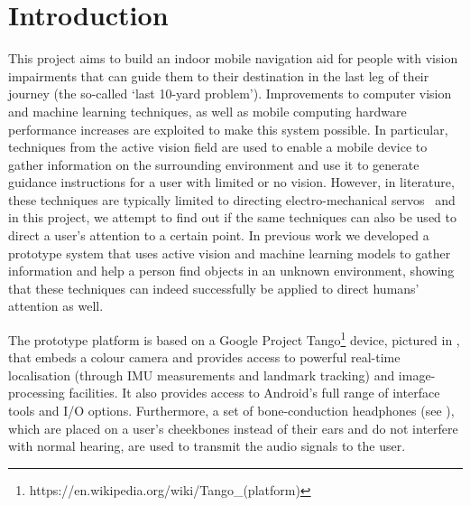 \documentclass[acmsmall]{acmart}
\begin{document}


\maketitle

\section{Introduction}

This project aims to build an indoor mobile navigation aid for people with vision impairments that can guide them to their destination in the last leg of their journey (the so-called `last 10-yard problem').
Improvements to computer vision and machine learning techniques, as well as mobile computing hardware performance increases are exploited to make this system possible.
In particular, techniques from the active vision field are used to enable a mobile device to gather information on the surrounding environment and use it to generate guidance instructions for a user with limited or no vision.
However, in literature, these techniques are typically limited to directing electro-mechanical servos~\citep{bajcsy2018revisiting} and in this project, we attempt to find out if the same techniques can also be used to direct a user's attention to a certain point. 
In previous work we developed a prototype system that uses active vision and machine learning models to gather information and help a person find objects in an unknown environment, showing that these techniques can indeed successfully be applied to direct humans' attention as well\citep{lock2019active}.

The prototype platform is based on a Google Project Tango\footnote{https://en.wikipedia.org/wiki/Tango\_(platform)} device, pictured in , that embeds a colour camera and provides access to powerful real-time localisation (through IMU measurements and landmark tracking) and image-processing facilities. 
It also provides access to Android's full range of interface tools and I/O options. 
Furthermore, a set of bone-conduction headphones (see ), which are placed on a user's cheekbones instead of their ears and do not interfere with normal hearing, are used to transmit the audio signals to the user.
\end{document}
